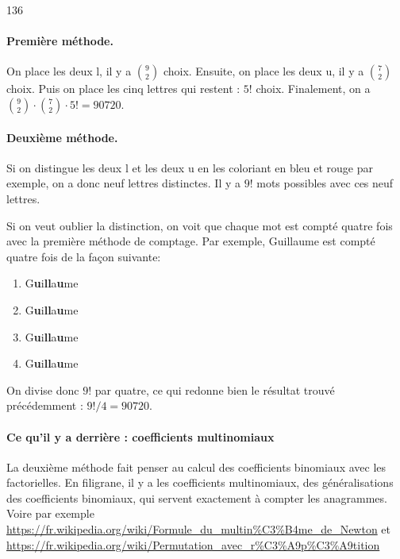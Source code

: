 \begin{Soln}{136}

\paragraph{Première méthode.}
On place les deux \og{}l\fg{}, il y a $\binom{9}{2}$ choix. Ensuite, on place les deux \og{}u\fg{}, il y a $\binom{7}{2}$ choix. Puis on place les cinq lettres qui restent : $5!$ choix. Finalement, on a $\binom{9}{2}\cdot\binom{7}{2}\cdot 5!=90720$.


\paragraph{Deuxième méthode.}
Si on distingue les deux \og{}l\fg{} et les deux \og{}u\fg{} en les coloriant en bleu et rouge par exemple, on a donc neuf lettres distinctes. Il y a $9!$ mots possibles avec ces neuf lettres.

Si on veut oublier la distinction, on voit que chaque mot est compté quatre fois avec la première méthode de comptage. Par exemple, \og Guillaume\fg{} est compté quatre fois de la façon suivante:
\begin{enumerate}
\item G{\bf\color{red}u}i{\bf\color{red}l}{\bf\color{blue}l}a{\bf\color{blue}u}me
\item G{\bf\color{blue}u}i{\bf\color{red}l}{\bf\color{blue}l}a{\bf\color{red}u}me
\item G{\bf\color{red}u}i{\bf\color{blue}l}{\bf\color{red}l}a{\bf\color{blue}u}me
\item G{\bf\color{blue}u}i{\bf\color{blue}l}{\bf\color{red}l}a{\bf\color{red}u}me
\end{enumerate}

On divise donc $9!$ par quatre, ce qui redonne bien le résultat trouvé précédemment : $9!/4 = 90720$.


\paragraph{Ce qu'il y a derrière :  coefficients multinomiaux} La deuxième méthode fait penser au calcul des coefficients binomiaux avec les factorielles. En filigrane, il y a les coefficients multinomiaux, des généralisations des coefficients binomiaux, qui servent exactement à compter les anagrammes. Voire par exemple \url{https://fr.wikipedia.org/wiki/Formule_du_multin%C3%B4me_de_Newton}
 et \url{https://fr.wikipedia.org/wiki/Permutation_avec_r%C3%A9p%C3%A9tition}
\end{Soln}
